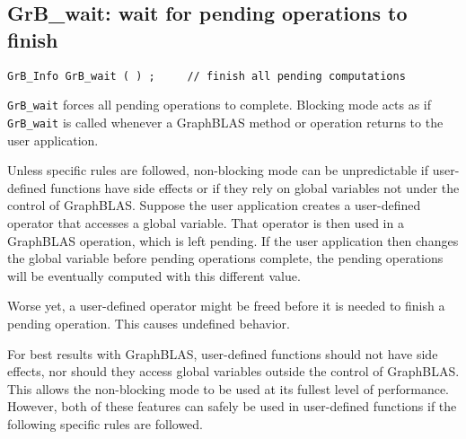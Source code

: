 \documentclass[12pt]{article}
\begin{document}
\newpage
\subsection{{\sf GrB\_wait:} wait for pending operations to finish} %
\label{wait}

\begin{mdframed}[userdefinedwidth=6in]
{\footnotesize
\begin{verbatim}
GrB_Info GrB_wait ( ) ;     // finish all pending computations
\end{verbatim}
}\end{mdframed}

\verb'GrB_wait' forces all pending operations to complete.
Blocking mode acts as if \verb'GrB_wait' is called whenever a GraphBLAS
method or operation returns to the user application.

Unless specific rules are followed, non-blocking mode can be unpredictable if
user-defined functions have side effects or if they rely on global variables
not under the control of GraphBLAS.  Suppose the user application creates a
user-defined operator that accesses a global variable.  That operator is then
used in a GraphBLAS operation, which is left pending.  If the user application
then changes the global variable before pending operations complete, the
pending operations will be eventually computed with this different value.

Worse yet, a user-defined operator might be freed before it is needed to finish
a pending operation.  This causes undefined behavior.

For best results with GraphBLAS, user-defined functions should not have side
effects, nor should they access global variables outside the control of
GraphBLAS.  This allows the non-blocking mode to be used at its fullest level
of performance.  However, both of these features can safely be used in
user-defined functions if the following specific rules are followed.
\end{document}
